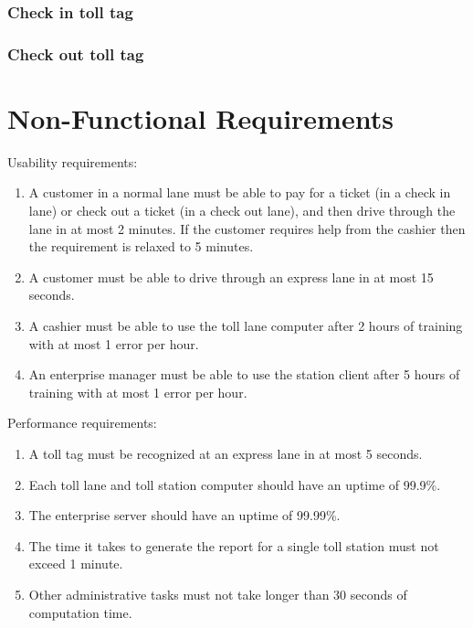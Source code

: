 \subsubsection{Check in toll tag} \label{sec:use_case_check_in_toll_tag}

\subsubsection{Check out toll tag} \label{sec:use_case_check_out_toll_tag}





\section{Non-Functional Requirements}
Usability requirements:
\begin{enumerate}
\item A customer in a normal lane must be able to pay for a ticket (in a check in lane) or check out a ticket (in a check out lane), and then drive through the lane in at most 2 minutes. If the customer requires help from the cashier then the requirement is relaxed to 5 minutes.
\item A customer must be able to drive through an express lane in at most 15 seconds.
\item A cashier must be able to use the toll lane computer after 2 hours of training with at most 1 error per hour.
\item An enterprise manager must be able to use the station client after 5 hours of training with at most 1 error per hour.
\end{enumerate}


Performance requirements:
\begin{enumerate}
\item A toll tag must be recognized at an express lane in at most 5 seconds.
\item Each toll lane and toll station computer should have an uptime of 99.9\%.
\item The enterprise server should have an uptime of 99.99\%.
\item The time it takes to generate the report for a single toll station must not exceed 1 minute.
\item Other administrative tasks must not take longer than 30 seconds of computation time.
\end{enumerate}